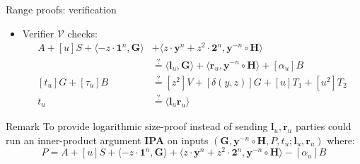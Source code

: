 \documentclass{zkdl-presentation-template}
\begin{document}
\begin{frame}{Range proofs: verification}
    \begin{itemize}
        \item Verifier $\mathcal{V}$ checks:
            \begin{equation*}
                \begin{aligned}
                    A + [u]S + \langle -z \cdot \mathbf{1}^n, \mathbf{G} \rangle &+ \langle z \cdot \mathbf{y}^n + z^2 \cdot \mathbf{2}^n, \mathbf{y}^{-n} \circ \mathbf{H} \rangle \\
                    &\stackrel{\text{?}}{=} \langle \mathbf{l}_u, \mathbf{G} \rangle + \langle \mathbf{r}_u, \mathbf{y}^{-n} \circ \mathbf{H} \rangle + [\alpha_u]B \\
                    [t_u]G + [\tau_u]B &\stackrel{\text{?}}{=} [z^2]V + [\delta(y,z)]G + [u]T_1 + [u^2]T_2 \\
                    t_u &\stackrel{\text{?}}{=} \langle \mathbf{l}_u \mathbf{r}_u \rangle
                \end{aligned}
            \end{equation*}
    \end{itemize}
    \begin{block}{Remark}
        To provide logarithmic size-proof instead of sending $\mathbf{l}_u, \mathbf{r}_u$ parties could run an inner-product argument \textbf{IPA} on inputs $(\mathbf{G},\mathbf{y}^{-n} \circ \mathbf{H}, P, t_u; \mathbf{l}_u, \mathbf{r}_u)$ where:
        $$P = A + [u]S + \langle -z \cdot \mathbf{1}^n, \mathbf{G} \rangle + \langle z \cdot \mathbf{y}^n + z^2 \cdot \mathbf{2}^n, \mathbf{y}^{-n} \circ \mathbf{H} \rangle - [\alpha_u]B$$
    \end{block}
\end{frame}
\end{document}
